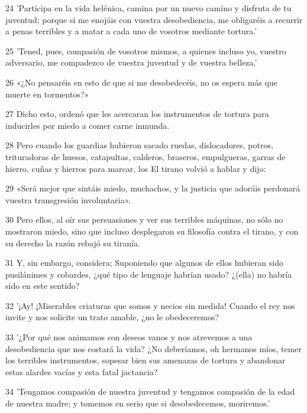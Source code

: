 \par 24 'Participa en la vida helénica, camina por un nuevo camino y disfruta de tu juventud; porque si me enojáis con vuestra desobediencia, me obligaréis a recurrir a penas terribles y a matar a cada uno de vosotros mediante tortura.'

\par 25 'Tened, pues, compasión de vosotros mismos, a quienes incluso yo, vuestro adversario, me compadezco de vuestra juventud y de vuestra belleza.'

\par 26 «¿No pensaréis en esto de que si me desobedecéis, no os espera más que muerte en tormentos?»

\par 27 Dicho esto, ordenó que les acercaran los instrumentos de tortura para inducirles por miedo a comer carne inmunda.

\par 28 Pero cuando los guardias hubieron sacado ruedas, dislocadores, potros, trituradoras de huesos, catapultas, calderos, braseros, empulgueras, garras de hierro, cuñas y hierros para marcar, los El tirano volvió a hablar y dijo:

\par 29 «Será mejor que sintáis miedo, muchachos, y la justicia que adoráis perdonará vuestra transgresión involuntaria».

\par 30 Pero ellos, al oír sus persuasiones y ver sus terribles máquinas, no sólo no mostraron miedo, sino que incluso desplegaron su filosofía contra el tirano, y con su derecho la razón rebajó su tiranía.

\par 31 Y, sin embargo, considera; Suponiendo que algunos de ellos hubieran sido pusilánimes y cobardes, ¿qué tipo de lenguaje habrían usado? ¿(ella) no habría sido en este sentido?

\par 32 '¡Ay! ¡Miserables criaturas que somos y necios sin medida! Cuando el rey nos invite y nos solicite un trato amable, ¿no le obedeceremos?

\par 33 '¿Por qué nos animamos con deseos vanos y nos atrevemos a una desobediencia que nos costará la vida? ¿No deberíamos, oh hermanos míos, temer los terribles instrumentos, sopesar bien sus amenazas de tortura y abandonar estas alardes vacías y esta fatal jactancia?

\par 34 'Tengamos compasión de nuestra juventud y tengamos compasión de la edad de nuestra madre; y tomemos en serio que si desobedecemos, moriremos.'


